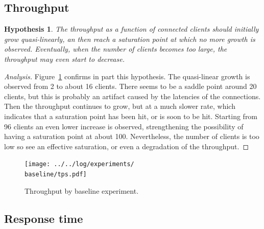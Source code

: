 \documentclass[11pt]{article}
\newtheorem{hyp}{Hypothesis}
\theoremstyle{definition}
\newenvironment{ana}[1][\proofname]{\begin{proof}[Analysis]}{\end{proof}}
\newcommand\baseline{01_memcached_baselines_16-10-21_08:20:35}
\begin{document}
\subsection{Throughput}\label{sec:baseline:tput}

\begin{hyp}
    The throughput as a function of connected clients should initially grow quasi-linearly, an then reach a saturation point at which no more growth is observed.
    Eventually, when the number of clients becomes too large, the throughput may even start to decrease.
\end{hyp}

\begin{ana}
    Figure~\ref{fig:baseline_tps_cloud} confirms in part this hypothesis.
    The quasi-linear growth is observed from 2 to about 16 clients.
    There seems to be a saddle point around 20 clients, but this is probably an artifact caused by the latencies of the connections.
    Then the throughput continues to grow, but at a much slower rate, which indicates that a saturation point has been hit, or is soon to be hit.
    Starting from 96 clients an even lower increase is observed, strengthening the possibility of having a saturation point at about 100.
    Nevertheless, the number of clients is too low so see an effective saturation, or even a degradation of the throughput.
\end{ana}

\begin{figure}[!h]
    \centering
    \texttt{[image: ../../log/experiments/\\baseline/tps.pdf]}
    \caption{Throughput by baseline experiment.}
    \label{fig:baseline_tps_cloud}
\end{figure}

\subsection{Response time}\label{sec:baseline:rt}
\end{document}
